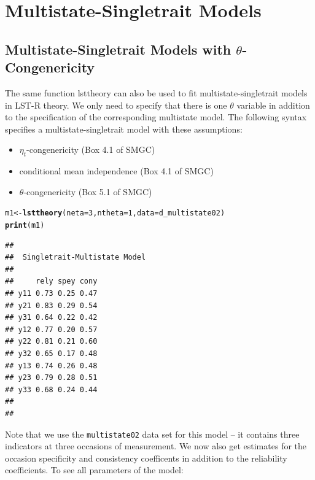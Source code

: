 \documentclass[10pt]{article}\usepackage[]{graphicx}\usepackage[]{xcolor}
\makeatletter
\newcommand{\hlnum}[1]{\textcolor[rgb]{0.686,0.059,0.569}{#1}}%
\newcommand{\hlstd}[1]{\textcolor[rgb]{0.345,0.345,0.345}{#1}}%
\newcommand{\hlkwb}[1]{\textcolor[rgb]{0.69,0.353,0.396}{#1}}%
\newcommand{\hlkwc}[1]{\textcolor[rgb]{0.333,0.667,0.333}{#1}}%
\newcommand{\hlkwd}[1]{\textcolor[rgb]{0.737,0.353,0.396}{\textbf{#1}}}%
\newenvironment{kframe}{%
 \def\at@end@of@kframe{}%
 \ifinner\ifhmode%
  \def\at@end@of@kframe{\end{minipage}}%
  \begin{minipage}{\columnwidth}%
 \fi\fi%
 \def\FrameCommand##1{\hskip\@totalleftmargin \hskip-\fboxsep
 \colorbox{shadecolor}{##1}\hskip-\fboxsep
     \hskip-\linewidth \hskip-\@totalleftmargin \hskip\columnwidth}%
 \MakeFramed {\advance\hsize-\width
   \@totalleftmargin\z@ \linewidth\hsize
   \@setminipage}}%
 {\par\unskip\endMakeFramed%
 \at@end@of@kframe}
\newenvironment{knitrout}{}{} %
\makeatother
\begin{document}
\newpage
\section{Multistate-Singletrait Models}

\subsection{Multistate-Singletrait Models with $\theta$-Congenericity}

The same function lsttheory can also be used to fit multistate-singletrait models in LST-R theory. We only need to specify that there is one $\theta$ variable in addition to the specification of the corresponding multistate model. The following syntax specifies a multistate-singletrait model with these assumptions:
%
\begin{itemize}
  \item $\eta_t$-congenericity (Box 4.1 of SMGC)
  \item conditional mean independence (Box 4.1 of SMGC)
  \item $\theta$-congenericity (Box 5.1 of SMGC)
\end{itemize}
%
\begin{knitrout}
\color{fgcolor}\begin{kframe}
\begin{alltt}
\hlstd{m1} \hlkwb{<-} \hlkwd{lsttheory}\hlstd{(}\hlkwc{neta}\hlstd{=}\hlnum{3}\hlstd{,} \hlkwc{ntheta}\hlstd{=}\hlnum{1}\hlstd{,} \hlkwc{data}\hlstd{=d_multistate02)}
\hlkwd{print}\hlstd{(m1)}
\end{alltt}
\begin{verbatim}
## 
##  Singletrait-Multistate Model 
##  
##     rely spey cony
## y11 0.73 0.25 0.47
## y21 0.83 0.29 0.54
## y31 0.64 0.22 0.42
## y12 0.77 0.20 0.57
## y22 0.81 0.21 0.60
## y32 0.65 0.17 0.48
## y13 0.74 0.26 0.48
## y23 0.79 0.28 0.51
## y33 0.68 0.24 0.44
## 
## 
\end{verbatim}
\end{kframe}
\end{knitrout}
%
Note that we use the \texttt{multistate02} data set for this model -- it contains three indicators at three occasions of measurement. We now also get estimates for the occasion specificity and consistency coefficents in addition to the reliability coefficients. To see all parameters of the model:
%
\end{document}
